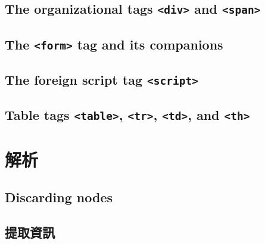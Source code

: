 \documentclass[
]{book}
\theoremstyle{definition}
\theoremstyle{remark}
\begin{document}
\hypertarget{the-organizational-tags-div-and-span}{%
\subsection{\texorpdfstring{The organizational tags \texttt{\textless{}div\textgreater{}} and \texttt{\textless{}span\textgreater{}}}{The organizational tags \textless div\textgreater{} and \textless span\textgreater{}}}\label{the-organizational-tags-div-and-span}}

\hypertarget{the-form-tag-and-its-companions}{%
\subsection{\texorpdfstring{The \texttt{\textless{}form\textgreater{}} tag and its companions}{The \textless form\textgreater{} tag and its companions}}\label{the-form-tag-and-its-companions}}

\hypertarget{the-foreign-script-tag-script}{%
\subsection{\texorpdfstring{The foreign script tag \texttt{\textless{}script\textgreater{}}}{The foreign script tag \textless script\textgreater{}}}\label{the-foreign-script-tag-script}}

\hypertarget{table-tags-table-tr-td-and-th}{%
\subsection{\texorpdfstring{Table tags \texttt{\textless{}table\textgreater{}}, \texttt{\textless{}tr\textgreater{}}, \texttt{\textless{}td\textgreater{}}, and \texttt{\textless{}th\textgreater{}}}{Table tags \textless table\textgreater, \textless tr\textgreater, \textless td\textgreater, and \textless th\textgreater{}}}\label{table-tags-table-tr-td-and-th}}

\hypertarget{parsing}{%
\section{解析}\label{parsing}}

\hypertarget{discarding-nodes}{%
\subsection{Discarding nodes}\label{discarding-nodes}}

\hypertarget{ux63d0ux53d6ux8cc7ux8a0a}{%
\subsection{提取資訊}\label{ux63d0ux53d6ux8cc7ux8a0a}}
\end{document}
